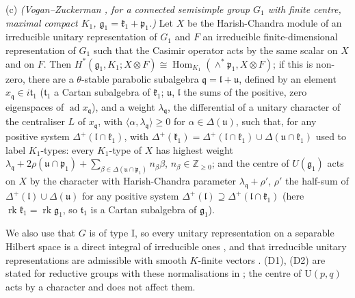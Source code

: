 \documentclass[10pt]{amsart}
\theoremstyle{definition}
\theoremstyle{remark}
\newcommand{\Z}{\mathbb Z}
\providecommand{\auU}{\mathrm U}
\begin{document}
\begin{enumerate}
(c) \emph{(Vogan--Zuckerman \cite[Proposition~5.4, Theorems~5.3 and~5.6]{VoganZuckerman}, for a connected semisimple group $G_1$ with finite centre, maximal compact $K_1$, $\mathfrak g_1=\mathfrak k_1+\mathfrak p_1$.)} Let $X$ be the Harish-Chandra module of an irreducible unitary representation of $G_1$ and $F$ an irreducible finite-dimensional representation of $G_1$ such that the Casimir operator acts by the same scalar on $X$ and on $F$. Then $H^*(\mathfrak g_1,K_1;X\otimes F)\cong\operatorname{Hom}_{K_1}(\wedge^*\mathfrak p_1,X\otimes F)$; if this is non-zero, there are a $\theta$-stable parabolic subalgebra $\mathfrak q=\mathfrak l+\mathfrak u$, defined by an element $x_{\mathfrak q}\in i\mathfrak t_{1}$ ($\mathfrak t_1$ a Cartan subalgebra of $\mathfrak k_1$; $\mathfrak u$, $\mathfrak l$ the sums of the positive, zero eigenspaces of $\operatorname{ad}x_{\mathfrak q}$), and a weight $\lambda_{\mathfrak q}$, the differential of a unitary character of the centraliser $L$ of $x_{\mathfrak q}$, with $\langle\alpha,\lambda_{\mathfrak q}\rangle\ge0$ for $\alpha\in\Delta(\mathfrak u)$, such that, for any positive system $\Delta^+(\mathfrak l\cap\mathfrak k_1)$, with $\Delta^+(\mathfrak k_1)=\Delta^+(\mathfrak l\cap\mathfrak k_1)\cup\Delta(\mathfrak u\cap\mathfrak k_1)$ used to label $K_1$-types: every $K_1$-type of $X$ has highest weight $\lambda_{\mathfrak q}+2\rho(\mathfrak u\cap\mathfrak p_1)+\sum_{\beta\in\Delta(\mathfrak u\cap\mathfrak p_1)}n_\beta\beta$, $n_\beta\in\Z_{\ge0}$; and the centre of $U(\mathfrak g_1)$ acts on $X$ by the character with Harish-Chandra parameter $\lambda_{\mathfrak q}+\rho'$, $\rho'$ the half-sum of $\Delta^+(\mathfrak l)\cup\Delta(\mathfrak u)$ for any positive system $\Delta^+(\mathfrak l)\supseteq\Delta^+(\mathfrak l\cap\mathfrak k_1)$ (here $\operatorname{rk}\mathfrak k_1=\operatorname{rk}\mathfrak g_1$, so $\mathfrak t_1$ is a Cartan subalgebra of $\mathfrak g_1$).
\end{enumerate}
We also use that $G$ is of type I, so every unitary representation on a separable Hilbert space
is a direct integral of irreducible ones \cite{Dixmier}, and that irreducible unitary
representations are admissible with smooth $K$-finite vectors \cite[Theorem~8.1 and Proposition~8.5]{Knapp}. (D1), (D2)
are stated for reductive groups with these normalisations in \cite[Proposition~1.1 and \S2]{HuangPandzic}; the centre of
$\auU(p,q)$ acts by a character and does not affect them.
\end{document}
